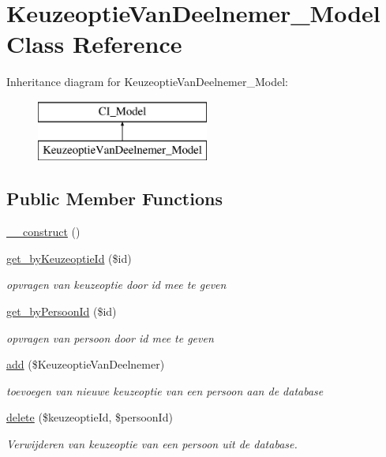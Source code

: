 \hypertarget{class_keuzeoptie_van_deelnemer___model}{}\section{Keuzeoptie\+Van\+Deelnemer\+\_\+\+Model Class Reference}
\label{class_keuzeoptie_van_deelnemer___model}
Inheritance diagram for Keuzeoptie\+Van\+Deelnemer\+\_\+\+Model\+:\begin{figure}[H]
\begin{center}
\leavevmode
\includegraphics[height=2.000000cm]{class_keuzeoptie_van_deelnemer___model}
\end{center}
\end{figure}
\subsection*{Public Member Functions}
\begin{DoxyCompactItemize}
\item 
\mbox{\hyperlink{class_keuzeoptie_van_deelnemer___model_a095c5d389db211932136b53f25f39685}{\+\_\+\+\_\+construct}} ()
\item 
\mbox{\hyperlink{class_keuzeoptie_van_deelnemer___model_a5240031a73a1db935718f12ab29d80ad}{get\+\_\+by\+Keuzeoptie\+Id}} (\$id)
\begin{DoxyCompactList}\small\item\em opvragen van keuzeoptie door id mee te geven \end{DoxyCompactList}\item 
\mbox{\hyperlink{class_keuzeoptie_van_deelnemer___model_aa04bd86e024fed6b73b051c9cbb9ec52}{get\+\_\+by\+Persoon\+Id}} (\$id)
\begin{DoxyCompactList}\small\item\em opvragen van persoon door id mee te geven \end{DoxyCompactList}\item 
\mbox{\hyperlink{class_keuzeoptie_van_deelnemer___model_a59e9964aa59737ee3789f9458fdc4ee2}{add}} (\$Keuzeoptie\+Van\+Deelnemer)
\begin{DoxyCompactList}\small\item\em toevoegen van nieuwe keuzeoptie van een persoon aan de database \end{DoxyCompactList}\item 
\mbox{\hyperlink{class_keuzeoptie_van_deelnemer___model_af718b06f52e41eecd48c19b480fd237a}{delete}} (\$keuzeoptie\+Id, \$persoon\+Id)
\begin{DoxyCompactList}\small\item\em Verwijderen van keuzeoptie van een persoon uit de database. \end{DoxyCompactList}\end{DoxyCompactItemize}


